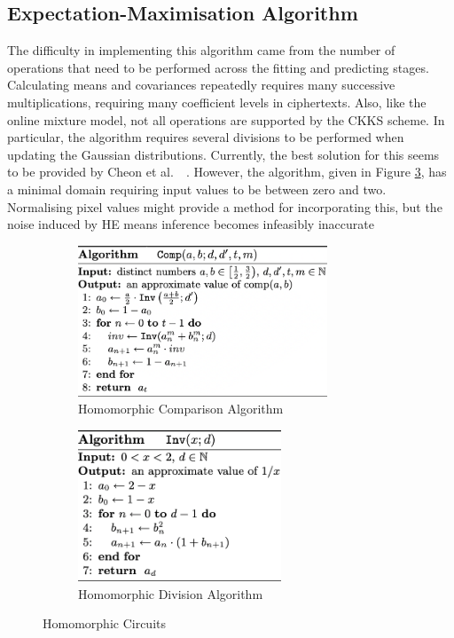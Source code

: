 \subsection{Expectation-Maximisation Algorithm}
\indent \indent
The difficulty in implementing this algorithm came from the number of operations that need to be performed across the fitting and predicting stages. Calculating means and covariances repeatedly requires many successive multiplications, requiring many coefficient levels in ciphertexts. Also, like the online mixture model, not all operations are supported by the CKKS scheme. In particular, the algorithm requires several divisions to be performed when updating the Gaussian distributions. Currently, the best solution for this seems to be provided by Cheon et al.\ ~\cite{Comparison}. However, the algorithm, given in Figure \ref{fig:division}, has a minimal domain requiring input values to be between zero and two. Normalising pixel values might provide a method for incorporating this, but the noise induced by HE means inference becomes infeasibly inaccurate
\begin{figure}
    \centering
    \begin{subfigure}[t]{0.45\textwidth}
        \centering
        \includegraphics[height=4.5cm]{figures/algorithm1}
        \caption{Homomorphic Comparison Algorithm}
        \label{fig:comparison}
    \end{subfigure}
    \hfill
    \begin{subfigure}[t]{0.45\textwidth}
        \centering
        \includegraphics[height=4.5cm]{figures/algorithm2}
        \caption{Homomorphic Division Algorithm}
        \label{fig:division}
    \end{subfigure}
    \caption{Homomorphic Circuits}
\end{figure}





